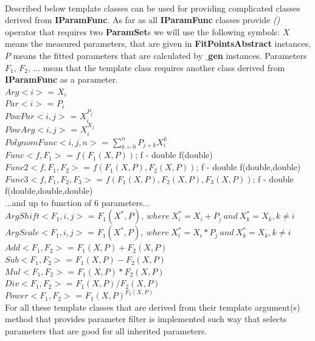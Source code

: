 \documentclass[a4paper]{article}
\begin{document}
\\
Described below template classes can be used for providing complicated classes derived from \textbf{IParamFunc}.
As far as all \textbf{IParamFunc} classes provide \textit{()} operator that requires two \textbf{ParamSet}s we will use the following symbols: $X$ means the measured parameters, that are given in \textbf{FitPointsAbstract} instances, $P$ means the fitted parameters that are calculated by \textbf{$\_$gen} instances.
Parameters $F_1$, $F_2$, ... mean that the template class requires another class derived from \textbf{IParamFunc} as a parameter.
\\
\textbf{$Arg<i>$} = $X_i$\\
\textbf{$Par<i>$} = $P_i$\\
\textbf{$PowPar<i,j>$} = $X_i^{P_j}$\\
\textbf{$PowArg<i,j>$} = $X_i^{X_j}$\\
\textbf{$PolynomFunc<i,j,n>$} = $\sum_{k=0}^{n}P_{j+k}X_i^k$\\
\textbf{$Func<f,F_1>$} = $f(F_1(X,P))$; f - double f(double)\\
\textbf{$Func2<f,F_1,F_2>$} = $f(F_1(X,P),F_2(X,P))$; f - double f(double,double)\\
\textbf{$Func3<f,F_1,F_2,F_3>$} = $f(F_1(X,P),F_2(X,P),F_3(X,P))$; f - double f(double,double,double)\\
...and up to function of 6 parameters...\\
\textbf{$ArgShift<F_1,i,j>$} = $F_1(X^*,P),~where~X^*_i=X_i+P_j~and~X^*_k=X_k, k \neq i$\\
\textbf{$ArgScale<F_1,i,j>$} = $F_1(X^*,P),~where~X^*_i=X_i*P_j~and~X^*_k=X_k, k \neq i$\\
\textbf{$Add<F_1,F_2>$} = $F_1(X,P)+F_2(X,P)$\\
\textbf{$Sub<F_1,F_2>$} = $F_1(X,P)-F_2(X,P)$\\
\textbf{$Mul<F_1,F_2>$} = $F_1(X,P)*F_2(X,P)$\\
\textbf{$Div<F_1,F_2>$} = $F_1(X,P)/F_2(X,P)$\\
\textbf{$Power<F_1,F_2>$} = $F_1(X,P)^{F_2(X,P)}$\\
For all these template classes that are derived from their template argument(s) method that provides parameter filter is implemented such way that selects parameters that are good for all inherited parameters.
\end{document}
